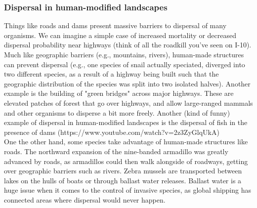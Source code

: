 \documentclass[12pt]{article}
\begin{document}
\subsubsection*{Dispersal in human-modified landscapes}

Things like roads and dams present massive barriers to dispersal of many organisms. We can imagine a simple case of increased mortality or decreased dispersal probability near highways (think of all the roadkill you've seen on I-10). Much like geographic barriers (e.g., mountains, rivers), human-made structures can prevent dispersal (e.g., one species of snail actually speciated, diverged into two different species, as a result of a highway being built such that the geographic distribution of the species was split into two isolated halves). Another example is the building of "green bridges" across major highways. These are elevated patches of forest that go over highways, and allow large-ranged mammals and other organisms to disperse a bit more freely. Another (kind of funny) example of dispersal in human-modified landscapes is the dispersal of fish in the presence of dams (https://www.youtube.com/watch?v=2z3ZyGlqUkA) \\

One the other hand, some species take advantage of human-made structures like roads. The northward expansion of the nine-banded armadillo was greatly advanced by roads, as armadillos could then walk alongside of roadways, getting over geographic barriers such as rivers. Zebra mussels are transported between lakes on the hulls of boats or through ballast water releases. Ballast water is a huge issue when it comes to the control of invasive species, as global shipping has connected areas where dispersal would never happen. \\











\end{document}
